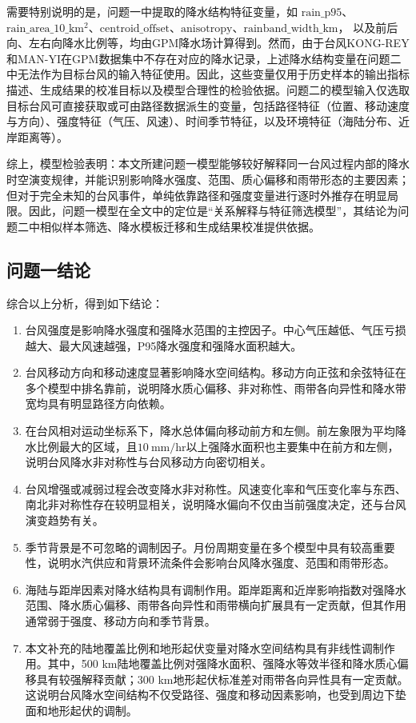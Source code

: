 \documentclass[UTF8,a4paper,zihao=5,fontset=fandol]{ctexart}
\numberwithin{equation}{section}
\numberwithin{figure}{section}
\numberwithin{table}{section}
\begin{document}
需要特别说明的是，问题一中提取的降水结构特征变量，如
$\mathrm{rain\_p95}$、$\mathrm{rain\_area\_10\_km^2}$、$\mathrm{centroid\_offset}$、$\mathrm{anisotropy}$、$\mathrm{rainband\_width\_km}$，
以及前后向、左右向降水比例等，均由GPM降水场计算得到。然而，由于台风KONG-REY和MAN-YI在GPM数据集中不存在对应的降水记录，上述降水结构变量在问题二中无法作为目标台风的输入特征使用。因此，这些变量仅用于历史样本的输出指标描述、生成结果的校准目标以及模型合理性的检验依据。问题二的模型输入仅选取目标台风可直接获取或可由路径数据派生的变量，包括路径特征（位置、移动速度与方向）、强度特征（气压、风速）、时间季节特征，以及环境特征（海陆分布、近岸距离等）。

综上，模型检验表明：本文所建问题一模型能够较好解释同一台风过程内部的降水时空演变规律，并能识别影响降水强度、范围、质心偏移和雨带形态的主要因素；但对于完全未知的台风事件，单纯依靠路径和强度变量进行逐时外推存在明显局限。因此，问题一模型在全文中的定位是“关系解释与特征筛选模型”，其结论为问题二中相似样本筛选、降水模板迁移和生成结果校准提供依据。


\subsection{问题一结论}

综合以上分析，得到如下结论：

\begin{enumerate}
    \item 台风强度是影响降水强度和强降水范围的主控因子。中心气压越低、气压亏损越大、最大风速越强，P95降水强度和强降水面积越大。
    \item 台风移动方向和移动速度显著影响降水空间结构。移动方向正弦和余弦特征在多个模型中排名靠前，说明降水质心偏移、非对称性、雨带各向异性和降水带宽均具有明显路径方向依赖。
    \item 在台风相对运动坐标系下，降水总体偏向移动前方和左侧。前左象限为平均降水比例最大的区域，且$10\ \mathrm{mm/hr}$以上强降水面积也主要集中在前方和左侧，说明台风降水非对称性与台风移动方向密切相关。
    \item 台风增强或减弱过程会改变降水非对称性。风速变化率和气压变化率与东西、南北非对称性存在较明显相关，说明降水偏向不仅由当前强度决定，还与台风演变趋势有关。
    \item 季节背景是不可忽略的调制因子。月份周期变量在多个模型中具有较高重要性，说明水汽供应和背景环流条件会影响台风降水强度、范围和雨带形态。
    \item 海陆与距岸因素对降水结构具有调制作用。距岸距离和近岸影响指数对强降水范围、降水质心偏移、雨带各向异性和雨带横向扩展具有一定贡献，但其作用通常弱于强度、移动方向和季节背景。
    \item 本文补充的陆地覆盖比例和地形起伏变量对降水空间结构具有非线性调制作用。其中，500 km陆地覆盖比例对强降水面积、强降水等效半径和降水质心偏移具有较强解释贡献；300 km地形起伏标准差对雨带各向异性具有一定贡献。这说明台风降水空间结构不仅受路径、强度和移动因素影响，也受到周边下垫面和地形起伏的调制。
\end{enumerate}
\end{document}
